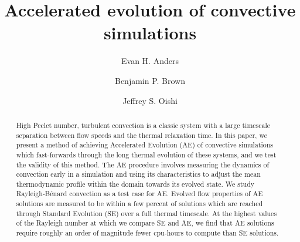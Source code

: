 \documentclass[aps, pre, onecolumn, nofootinbib, notitlepage, groupedaddress, amsfonts, amssymb, amsmath, longbibliography]{revtex4-1}
\newcommand{\RB}{Rayleigh-B\'{e}nard }
\begin{document}
\author{Evan H. Anders}
\author{Benjamin P. Brown}
\author{Jeffrey S. Oishi}
\title{Accelerated evolution of convective simulations}

\begin{abstract}
High Peclet number, turbulent convection is a classic system with a large timescale
separation between flow speeds and the thermal relaxation time.
In this paper, we present a method of achieving Accelerated Evolution (AE) of convective simulations which
fast-forwards through the long thermal evolution of these systems, and we test the
validity of this method. The AE procedure involves measuring the dynamics of convection
early in a simulation and using its characteristics to adjust the mean thermodynamic
profile within the domain towards its evolved state. We study \RB convection as a test case for AE.  
Evolved flow properties of AE solutions are measured to be within a few percent
of solutions which are reached through Standard Evolution (SE) over a full thermal timescale.
At the highest values of the Rayleigh number at which we compare SE and AE,
we find that AE solutions require roughly an order of magnitude fewer cpu-hours
to compute than SE solutions.
\end{abstract}
\maketitle

\end{document}
